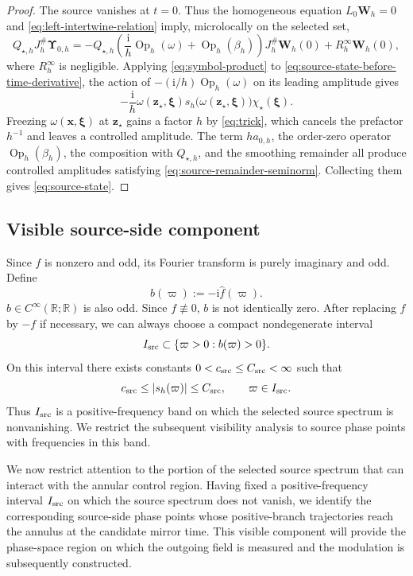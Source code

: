 \documentclass[11pt,reqno]{amsart}
\newcommand{\ii}{\mathrm{i}}
\newcommand{\Op}{\operatorname{Op}}
\numberwithin{equation}{section}
\begin{document}
\begin{proof}
The source vanishes at $t=0$. Thus the homogeneous equation $L_0\bm{W}_h=0$ and \eqref{eq:left-intertwine-relation} imply, microlocally on the selected set,
\begin{equation*}
 Q_{\star,h}J_h^{\#}\bm{\Upsilon}_{0,h}
 =-Q_{\star,h}\left(\frac{\ii}{h}\Op_h(\omega)+\Op_h(\beta_h)\right)
 J_h^{\#}\bm W_h(0)+R_h^\infty\bm W_h(0),
\end{equation*}
where $R_h^\infty$ is negligible. Applying \eqref{eq:symbol-product} to \eqref{eq:source-state-before-time-derivative}, the action of $-(\ii/h)\Op_h(\omega)$ on its leading amplitude gives
\begin{equation*}
 -\frac{\ii}{h}\omega(\bm z_\star,\bm\xi)s_h\bigl(\omega(\bm z_\star,\bm\xi)\bigr)\chi_\star(\bm\xi).
\end{equation*}
Freezing $\omega(\bm x,\bm\xi)$ at $\bm z_\star$ gains a factor $h$ by \eqref{eq:trick}, which cancels the prefactor $h^{-1}$ and leaves a controlled amplitude. The term $h a_{0,h}$, the order-zero operator $\Op_h(\beta_h)$, the composition with $Q_{\star,h}$, and the smoothing remainder all produce controlled amplitudes satisfying \eqref{eq:source-remainder-seminorm}. Collecting them gives \eqref{eq:source-state}.
\end{proof}

\subsection{Visible source-side component}

Since $f$ is nonzero and odd, its Fourier transform is purely imaginary and odd. Define 
$$
    b(\varpi):=-\ii\hat{f}(\varpi).
$$
$b\in C^\infty(\mathbb{R};\mathbb{R})$ is also odd. Since $f\not\equiv 0$, $b$ is not identically zero. After replacing $f$ by $-f$ if necessary, we can always choose a compact nondegenerate interval
\begin{equation*}
    I_{\rm src}\subset\{\varpi>0:b(\varpi)>0\}.
\end{equation*}
On this interval there exists constants $0<c_{\rm src}\leq C_{\rm src}<\infty$ such that 
$$
    c_{\rm src}\leq |s_h(\varpi)|\leq C_{\rm src}, \qquad \varpi\in I_{\rm src}.
$$
Thus $I_{\rm src}$ is a positive-frequency band on which the selected source spectrum is nonvanishing. We restrict the subsequent visibility analysis to source phase points with frequencies in this band.

We now restrict attention to the portion of the selected source spectrum that can interact with the annular control region. Having fixed a positive-frequency interval $I_{\rm src}$ on which the source spectrum does not vanish, we identify the corresponding source-side phase points whose positive-branch trajectories reach the annulus at the candidate mirror time. This visible component will provide the phase-space region on which the outgoing field is measured and the modulation is subsequently constructed.
\end{document}

